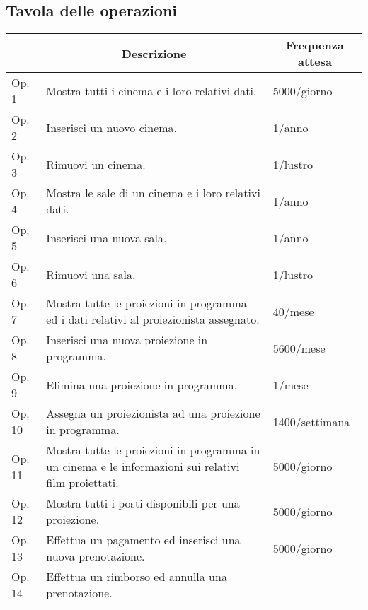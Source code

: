 \subsection*{Tavola delle operazioni}
%
%
\begin{tabularx}{\linewidth}{|l|X|X|}
    \hline
    \rowcolor{tblhdrcolor}
    \multicolumn{1}{|c|}{\textbf{Cod.}}
     & \multicolumn{1}{|c|}{\textbf{Descrizione}}
     & \multicolumn{1}{|c|}{\textbf{Frequenza attesa}}
    \\ \hline
    Op. 1
     & Mostra tutti i cinema e i loro relativi dati.
     & 5000/giorno
    \\ \hline
    Op. 2
     & Inserisci un nuovo cinema.
     & 1/anno
    \\ \hline
    Op. 3
     & Rimuovi un cinema.
     & 1/lustro
    \\ \hline
    Op. 4
     & Mostra le sale di un cinema e i loro relativi dati.
     & 1/anno
    \\ \hline
    Op. 5
     & Inserisci una nuova sala.
     & 1/anno
    \\ \hline
    Op. 6
     & Rimuovi una sala.
     & 1/lustro
    \\ \hline
    Op. 7
     & Mostra tutte le proiezioni in programma ed i dati relativi al
    proiezionista assegnato.
     & 40/mese
    \\ \hline
    Op. 8
     & Inserisci una nuova proiezione in programma.
     & 5600/mese
    \\ \hline
    Op. 9
     & Elimina una proiezione in programma.
     & 1/mese
    \\ \hline
    Op. 10
     & Assegna un proiezionista ad una proiezione in programma.
     & 1400/settimana
    \\ \hline
    Op. 11
     & Mostra tutte le proiezioni in programma in un cinema e le informazioni
    sui relativi film proiettati.
     & 5000/giorno
    \\ \hline
    Op. 12
     & Mostra tutti i posti disponibili per una proiezione.
     & 5000/giorno
    \\ \hline
    Op. 13
     & Effettua un pagamento ed inserisci una nuova prenotazione.
     & 5000/giorno
    \\ \hline
    Op. 14
     & Effettua un rimborso ed annulla una prenotazione.

\end{tabularx}
